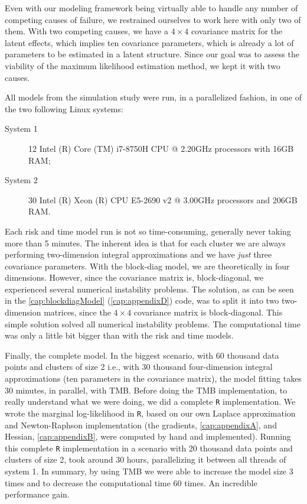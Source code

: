 Even with our modeling framework being virtually able to handle any
number of competing causes of failure, we restrained ourselves to work
here with only two of them. With two competing causes, we have
a \(4\times4\) covariance matrix for the latent effects, which implies
ten covariance parameters, which is already a lot of parameters to be
estimated in a latent structure. Since our goal was to assess the
viability of the maximum likelihood estimation method, we kept it with
two causes.

All models from the simulation study were run, in a parallelized
fashion, in one of the two following Linux systems:
\begin{description}
 \item[System 1]
  12 Intel (R) Core (TM) i7-8750H CPU @ 2.20GHz processors
  with 16GB RAM;
 \item[System 2]
  30 Intel (R) Xeon (R) CPU E5-2690 v2 @ 3.00GHz processors
  and 206GB RAM.
\end{description}

Each risk and time model run is not so time-consuming, generally never
taking more than 5 minutes. The inherent idea is that for each cluster
we are always performing two-dimension integral approximations and we
have \textit{just} three covariance parameters. With the block-diag
model, we are theoretically in four dimensions. However, since the
covariance matrix is, block-diagonal, we experienced several numerical
instability problems. The solution, as can be seen in the
\autoref{cap:blockdiagModel} (\autoref{cap:appendixD}) code, was to
split it into two two-dimension matrices, since the \(4\times4\)
covariance matrix is block-diagonal.  This simple solution solved all
numerical instability problems. The computational time was only a little
bit bigger than with the risk and time models.

Finally, the complete model. In the biggest scenario, with 60 thousand
data points and clusters of size 2 i.e., with 30 thousand four-dimension
integral approximations (ten parameters in the covariance matrix), the
model fitting takes 30 minutes, in parallel, with TMB. Before doing the
TMB implementation, to really understand what we were doing, we did a
complete \texttt{R} implementation. We wrote the marginal log-likelihood
in \texttt{R}, based on our own Laplace approximation \cite{patrao} and
Newton-Raphson implementation (the gradients, \autoref{cap:appendixA},
and Hessian, \autoref{cap:appendixB}, were computed by hand and
implemented). Running this complete \texttt{R} implementation in a
scenario with 20 thousand data points and clusters of size 2, took
around 30 hours, parallelizing it between all threads of system 1. In
summary, by using TMB we were able to increase the model size 3 times
and to decrease the computational time 60 times. An incredible
performance gain.

